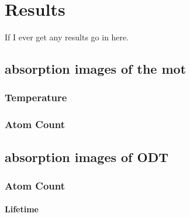 \chapter{Results}

If I ever get any results go in here.

\section{absorption images of the mot}

    \subsection{Temperature}

    \subsection{Atom Count}

\section{absorption images of ODT}

    \subsection{Atom Count}

    \subsubsection{Lifetime}
